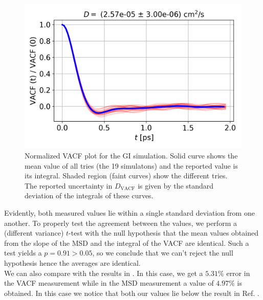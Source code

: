 \documentclass[%
aps,
pra,%
amsmath,amssymb,
preprint,%
reprint,%
notitlepage,
a4paper]{revtex4-1}
\begin{document}
\begin{figure}
	\centering
	\includegraphics[width=0.9\linewidth]{../task2/results/vacfvst}
	\caption{Normalized VACF plot for the GI simulation. Solid curve shows the mean value of all tries (the 19 simulatons) and the reported value is its integral. Shaded region (faint curves) show the different tries. The reported uncertainty in $D_\mathrm{VACF}$ is given by the standard deviation of the integrals of these curves.}
	\label{fig:vacfvst}
\end{figure}
Evidently, both measured values lie within a single standard deviation from one another. To properly test the agreement between the values, we perform a (different variance) $t$-test with the null hypothesis that the mean values obtained from the slope of the MSD and the integral of the VACF are identical. Such a test yields a $p=0.91 > 0.05$, so we conclude that we can't reject the null hypothesis hence the averages are identical.\\
We can also compare with the results in \citep{Rahman1964}. In this case, we get a $5.31\%$ error in the VACF measurement while in the MSD measurement a value of $4.97\%$ is obtained. In this case we notice that both our values lie below the result in Ref. \cite{Rahman1964}.
\end{document}
